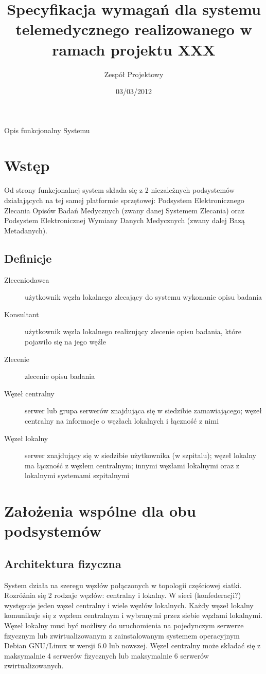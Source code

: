 \documentclass[a4paper]{article}
\title{Specyfikacja wymagań dla systemu telemedycznego realizowanego w ramach projektu XXX}
\author{Zespół Projektowy}
\date{03/03/2012}
\begin{document}
\maketitle
\tableofcontents

Opis funkcjonalny Systemu

\section{Wstęp}

Od strony funkcjonalnej system składa się z 2 niezależnych podsystemów działających na tej samej platformie sprzętowej: Podsystem Elektronicznego Zlecania Opisów Badań Medycznych (zwany danej Systemem Zlecania) oraz Podsystem Elektronicznej Wymiany Danych Medycznych (zwany dalej Bazą Metadanych).

\subsection{Definicje}

\begin{description}
\item[Zleceniodawca] użytkownik węzła lokalnego zlecający do systemu wykonanie opisu badania
\item[Konsultant] użytkownik węzła lokalnego realizujący zlecenie opisu badania, które pojawiło się na jego węźle
\item[Zlecenie] zlecenie opisu badania
\item[Węzeł centralny] serwer lub grupa serwerów znajdująca się w siedzibie zamawiającego; węzeł centralny na informacje o węzłach lokalnych i łączność z nimi
\item[Węzeł lokalny] serwer znajdujący się w siedzibie użytkownika (w szpitalu); węzeł lokalny ma łączność z węzłem centralnym; innymi węzłami lokalnymi oraz z lokalnymi systemami szpitalnymi
\end{description}

\section{Założenia wspólne dla obu podsystemów}

\subsection{Architektura fizyczna}
\label{sec:arch_fiz}

System działa na szeregu węzłów połączonych w topologii częściowej siatki. Rozróżnia się 2 rodzaje węzłów: centralny i lokalny. W sieci (konfederacji?) występuje jeden węzeł centralny i wiele węzłów lokalnych. Każdy węzeł lokalny komunikuje się z węzłem centralnym i wybranymi przez siebie węzłami lokalnymi. Węzeł lokalny musi być możliwy do uruchomienia na pojedynczym serwerze fizycznym lub zwirtualizowanym z zainstalowanym systemem operacyjnym Debian GNU/Linux w wersji 6.0 lub nowszej. Węzeł centralny może składać się z maksymalnie 4 serwerów fizycznych lub maksymalnie 6 serwerów zwirtualizowanych. 
\end{document}
